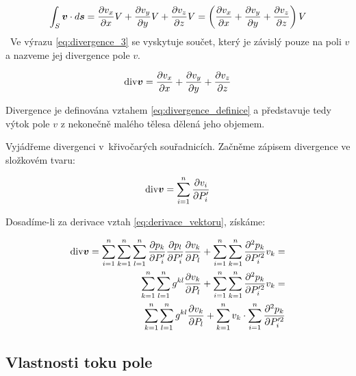 \begin{equation}
\label{eq:divergence_3}
\int_S \boldsymbol{v} \cdot d\boldsymbol{s} = \frac{\partial v_x}{\partial x} V + \frac{\partial v_y}{\partial y} V + \frac{\partial v_z}{\partial z} V = \left(\frac{\partial v_x}{\partial x} + \frac{\partial v_y}{\partial y} + \frac{\partial v_z}{\partial z}\right) V
\end{equation}
\
Ve výrazu \eqref{eq:divergence_3} se vyskytuje součet, který je závislý pouze na poli \(v\) a nazveme jej divergence pole \(v\). 

\begin{equation}
\label{eq:divergence_definice}
\mathrm{div} \boldsymbol{v} = \frac{\partial v_x}{\partial x} + \frac{\partial v_y}{\partial y} + \frac{\partial v_z}{\partial z}
\end{equation}

Divergence je definována vztahem \eqref{eq:divergence_definice} a představuje tedy výtok pole \(v\) z nekonečně malého tělesa dělená jeho objemem.

Vyjádřeme divergenci v~křivočarých souřadnicích. Začněme zápisem divergence ve složkovém tvaru:

\begin{equation}
\mathrm{div} \boldsymbol{v} = \sum_{i=1}^n \frac{\partial v_i}{\partial P'_i}
\end{equation}

Dosadíme-li za derivace vztah \eqref{eq:derivace_vektoru}, získáme:

\begin{equation}
\begin{split}
\mathrm{div} \boldsymbol{v} = \sum_{i=1}^n \sum_{k=1}^n \sum_{l=1}^n \frac{\partial p_k}{\partial P'_i} \frac{\partial p_l}{\partial P'_i} \frac{\partial v_k}{\partial P_l} + \sum_{i=1}^n \sum_{k=1}^n \frac{\partial^2 p_k}{\partial P'^2_i} v_k = \\
\sum_{k=1}^n \sum_{l=1}^n g^{kl} \frac{\partial v_k}{\partial P_l} + \sum_{i=1}^n \sum_{k=1}^n \frac{\partial^2 p_k}{\partial P'^2_i} v_k = \\
\sum_{k=1}^n \sum_{l=1}^n g^{kl} \frac{\partial v_k}{\partial P_l} + \sum_{k=1}^n v_k \cdot \sum_{i=1}^n \frac{\partial^2 p_k}{\partial P'^2_i}
\end{split}
\end{equation}

\subsection{Vlastnosti toku pole}

